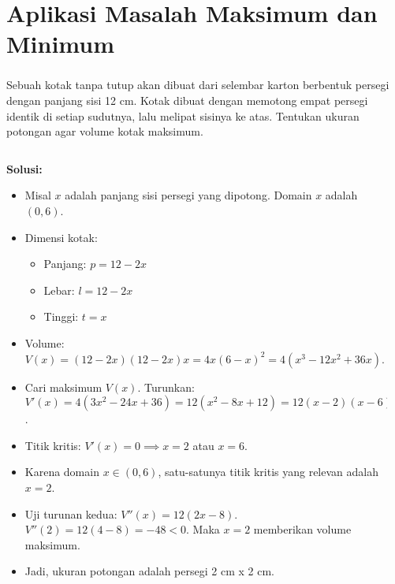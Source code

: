 \documentclass{../../kalkulus-ppt}
\begin{document}
\section{Aplikasi Masalah Maksimum dan Minimum}
\begin{frame}
  \frametitle{\insertsection}
  \begin{contoh}
    Sebuah kotak tanpa tutup akan dibuat dari selembar karton berbentuk persegi dengan panjang sisi 12 cm. Kotak dibuat dengan memotong empat persegi identik di setiap sudutnya, lalu melipat sisinya ke atas. Tentukan ukuran potongan agar volume kotak maksimum.
  \end{contoh}
  \pause
  \begin{columns}[T]
    \begin{column}{0.5\textwidth}
      \textbf{Solusi:}
      \begin{itemize}
        \item Misal $x$ adalah panjang sisi persegi yang dipotong. Domain $x$ adalah $(0,6)$.
        \item Dimensi kotak:
              \begin{itemize}
                \item Panjang: $p = 12 - 2x$
                \item Lebar: $l = 12 - 2x$
                \item Tinggi: $t = x$
              \end{itemize}
        \item Volume: $V(x) = (12-2x)(12-2x)x = 4x(6-x)^2 = 4(x^3 - 12x^2 + 36x)$.
        \item Cari maksimum $V(x)$. Turunkan: $V'(x) = 4(3x^2 - 24x + 36) = 12(x^2 - 8x + 12) = 12(x-2)(x-6)$.
        \item Titik kritis: $V'(x)=0 \implies x=2$ atau $x=6$.
        \item Karena domain $x \in (0,6)$, satu-satunya titik kritis yang relevan adalah $x=2$.
        \item Uji turunan kedua: $V''(x) = 12(2x-8)$. $V''(2) = 12(4-8) = -48 < 0$. Maka $x=2$ memberikan volume maksimum.
        \item Jadi, ukuran potongan adalah persegi 2 cm x 2 cm.
      \end{itemize}
    \end{column}
    \begin{column}{0.5\textwidth}
      \centering
    \end{column}
  \end{columns}
\end{frame}
\end{document}
